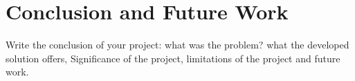 \section{Conclusion and Future Work}\label{sec:cfw}
Write the conclusion of your project: what was the problem? what the developed solution offers, Significance of the project, limitations of the project and future work. 
\clearpage